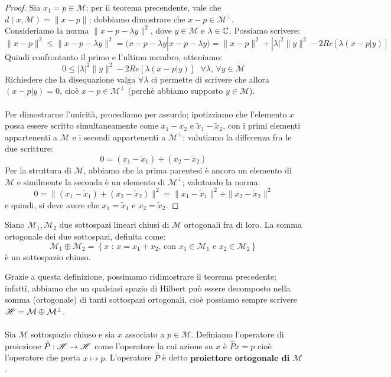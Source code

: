 \begin{proof}
Sia $x_1=p \in \mathcal{M}$; per il teorema precendente, vale che  $d(x,\mathcal{M})=\|x-p\|$; dobbiamo dimostrare che $x-p \in \mathcal{M}^{\perp}$.\\
Consideriamo la norma $\|x-p-\lambda y\|^2$, dove $y \in \mathcal{M}$ e $\lambda \in \mathbb{C}$. Possiamo scrivere:
$$\|x-p\|^2 \leq \|x-p-\lambda y\|^2 = (x-p- \lambda y|x-p-\lambda y)=\|x-p\|^2 + |\lambda |^2 \|y\|^2 -2Re[\lambda (x-p|y)]$$
Quindi confrontanto il primo e l'ultimo membro, otteniamo:
$$0 \leq  |\lambda |^2 \|y\|^2 -2Re[\lambda (x-p|y)] \text{ } \forall \lambda , \, \forall y \in \mathcal{M}$$
Richiedere che la disequazione valga $\forall \lambda$ ci permette di scrivere che allora $(x-p|y)=0$, cioè $x-p \in \mathcal{M}^{\perp}$ (perchè abbiamo supposto $y \in \mathcal{M}$).\\
\\
Per dimostrarne l'unicità, procediamo per assurdo; ipotizziamo che l'elemento $x$ possa essere scritto simultaneamente come $x_1-x_2$ e $\tilde{x}_1 - \tilde{x}_2$, con i primi elementi appartenenti a $\mathcal{M}$ e i secondi appartenenti a $\mathcal{M}^{\perp}$; valutiamo la differenza fra le due scritture:
$$0=(x_1- \tilde{x}_1)+(x_2-\tilde{x}_2)$$
Per la struttura di $\mathcal{M}$, abbiamo che la prima parentesi è ancora un elemento di $\mathcal{M}$ e similmente la seconda è un elemento di $\mathcal{M}^{\perp}$; valutando la norma:
$$0=\|(x_1- \tilde{x}_1)+(x_2-\tilde{x}_2)\|^2=\|x_1- \tilde{x}_1\|^2+\|x_2-\tilde{x}_2\|^2$$
e quindi, si deve avere che $x_1= \tilde{x}_1$ e $x_2=\tilde{x}_2$.
\end{proof}
\begin{definizione}
Siano $\mathcal{M}_1, \mathcal{M}_2$ due sottospazi lineari chiusi di $\mathcal{M}$ ortogonali fra di loro. La somma ortogonale dei due sottospazi, definita come:
$$\mathcal{M}_1 \oplus \mathcal{M}_2=\left\{x \text{ : } x=x_1+x_2\text{, con } x_1 \in \mathcal{M}_1 \text{ e } x_2 \in \mathcal{M}_2 \right\}$$
è un sottospazio chiuso.
\end{definizione}
Grazie a questa definizione, possimamo ridimostrare il teorema precedente; infatti, abbiamo che un qualsiasi spazio di Hilbert può essere decomposto nella somma (ortogonale) di tanti sottospazi ortogonali, cioè possiamo sempre scrivere $\mathscr{H}=\mathcal{M} \oplus \mathcal{M}^{\perp}$.
\\
\\
Sia $\mathcal{M}$ sottospazio chiuso e sia $x$ associato a $p \in \mathcal{M}$. Definiamo l'operatore di proiezione $\hat{P}: \mathscr{H} \to \mathscr{H}$ come l'operatore la cui azione su $x$ è $\hat{P} x=p$ cioè l'operatore che porta $x \mapsto p$. L'operatore $\hat{P}$ è detto \textbf{proiettore ortogonale di $\mathcal{M}$}.\\
